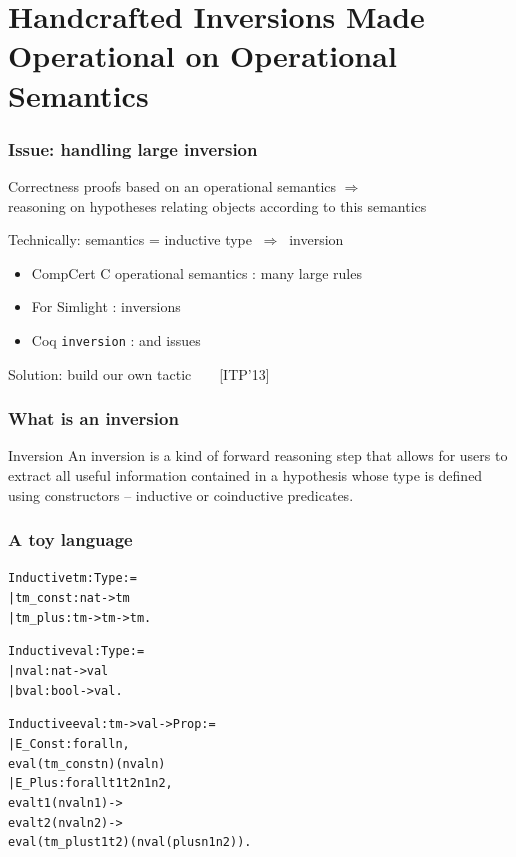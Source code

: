 \documentclass[usenames,dvipsnames]{beamer} %
\newcommand{\hcinv}{\texttt{hc\_inversion}\xspace}
\begin{document}
\section{Handcrafted Inversions Made Operational on Operational Semantics}
\begin{frame}
\frametitle{Issue: handling large inversion}

Correctness proofs based on an operational semantics $\Rightarrow$ \\
reasoning on hypotheses relating objects 
according to this semantics

\medskip

Technically: semantics = inductive type $~\Rightarrow~$ inversion

\medskip

\begin{itemize}
\item
  CompCert C operational semantics : many large rules
\item
  For Simlight : inversions 
\item 
  Coq \texttt{inversion} :  and  issues
\end{itemize}

\medskip

Solution: build our own tactic ~ \bleu{\hcinv} ~ [ITP'13]

\end{frame}

\begin{frame}
\frametitle{What is an inversion}
\begin{block}{Inversion}
An inversion is a kind of forward reasoning step that allows for users to extract all useful information contained in a hypothesis whose type is defined using constructors -- inductive or coinductive predicates.
\end{block}
\end{frame}


\begin{frame}[fragile]
\frametitle{A toy language}
\small
\begin{alltt}
Inductive tm : Type :=
  | tm_const : nat -> tm
  | tm_plus : tm -> tm -> tm.

Inductive val : Type :=
  | nval  : nat -> val
  | bval  : bool -> val.

Inductive eval : tm -> val -> Prop :=
  | E_Const : forall n,
      eval (tm_const n) (nval n)
  | E_Plus : forall t1 t2 n1 n2,
      eval t1 (nval n1) ->
      eval t2 (nval n2) ->
      eval (tm_plus t1 t2) (nval (plus n1 n2)).
\end{alltt}
\end{frame}
\end{document}
